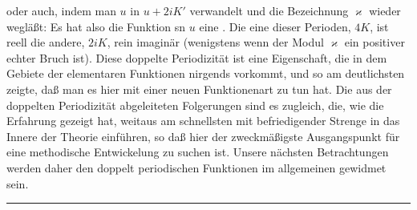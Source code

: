 
oder auch, indem man $u$ in $u+2iK'$ verwandelt und die Bezeichnung $\varkappa$ wieder wegläßt:
Es hat also die Funktion sn $u$ eine . Die eine dieser Perioden, $4K$, ist reell die andere, $2iK$, rein imaginär %
 (wenigstens wenn der Modul $\varkappa$ ein positiver echter Bruch ist). Diese doppelte Periodizität ist eine Eigenschaft, die in dem Gebiete der elementaren Funktionen nirgends vorkommt, und so am deutlichsten zeigte, daß man es hier mit einer neuen Funktionenart zu tun hat. Die aus der doppelten Periodizität abgeleiteten Folgerungen sind es zugleich, die, wie die Erfahrung gezeigt hat, weitaus am schnellsten mit befriedigender Strenge in das Innere der Theorie einführen, so daß hier der zweckmäßigste Ausgangspunkt für eine methodische Entwickelung zu suchen ist. Unsere nächsten Betrachtungen werden daher den doppelt periodischen Funktionen im allgemeinen gewidmet sein.
\begin{center}
\rule{3cm}{0.4pt}
\end{center}
